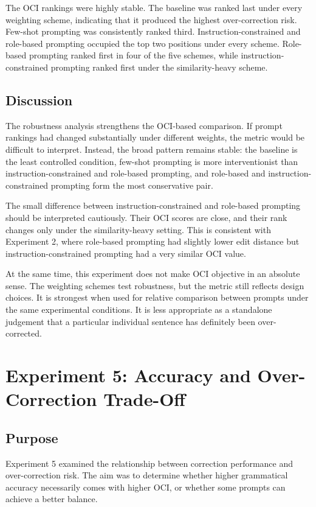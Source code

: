 The OCI rankings were highly stable. The baseline was ranked last under every weighting scheme, indicating that it produced the highest over-correction risk. Few-shot prompting was consistently ranked third. Instruction-constrained and role-based prompting occupied the top two positions under every scheme. Role-based prompting ranked first in four of the five schemes, while instruction-constrained prompting ranked first under the similarity-heavy scheme.

\subsection{Discussion}

The robustness analysis strengthens the OCI-based comparison. If prompt rankings had changed substantially under different weights, the metric would be difficult to interpret. Instead, the broad pattern remains stable: the baseline is the least controlled condition, few-shot prompting is more interventionist than instruction-constrained and role-based prompting, and role-based and instruction-constrained prompting form the most conservative pair.

The small difference between instruction-constrained and role-based prompting should be interpreted cautiously. Their OCI scores are close, and their rank changes only under the similarity-heavy setting. This is consistent with Experiment 2, where role-based prompting had slightly lower edit distance but instruction-constrained prompting had a very similar OCI value.

At the same time, this experiment does not make OCI objective in an absolute sense. The weighting schemes test robustness, but the metric still reflects design choices. It is strongest when used for relative comparison between prompts under the same experimental conditions. It is less appropriate as a standalone judgement that a particular individual sentence has definitely been over-corrected.

\section{Experiment 5: Accuracy and Over-Correction Trade-Off}

\subsection{Purpose}

Experiment 5 examined the relationship between correction performance and over-correction risk. The aim was to determine whether higher grammatical accuracy necessarily comes with higher OCI, or whether some prompts can achieve a better balance.

